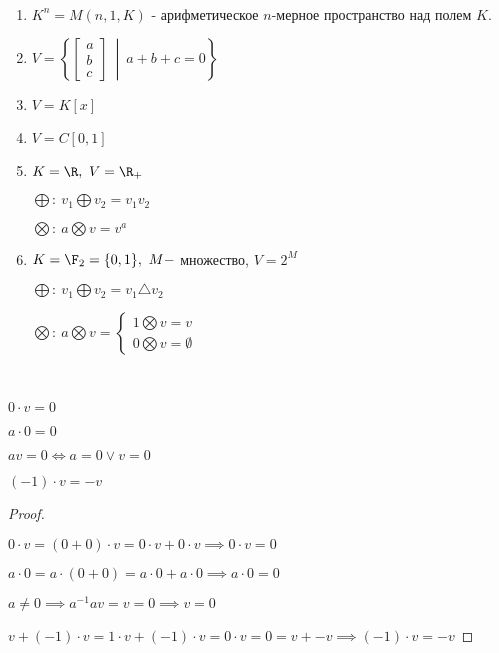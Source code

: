 \begin{example}~

    \begin{enumerate}
        \item $K^n = M(n, 1, K)$ - арифметическое $n$-мерное пространство над полем $K$.
        \item $V = \left\{\begin{bmatrix}
            a \\
            b \\
            c
        \end{bmatrix} ~ \middle| ~ a + b + c = 0\right\}$
        \item $V = K[x]$
        \item $V = C[0, 1]$
        \item $K = \R, ~ V = \R_+$

        $\bigoplus: ~ v_1 \bigoplus v_2 = v_1v_2$
    
        $\bigotimes: ~ a \bigotimes v = v^a$
        \item $K = \F_2 = \{0, 1\}, ~ M - $ множество, $V = 2^M$

        $\bigoplus: ~ v_1 \bigoplus v_2 = v_1\triangle v_2$
    
        $\bigotimes: ~ a \bigotimes v = \begin{cases}
            1 \bigotimes v = v \\
            0 \bigotimes v = \emptyset
        \end{cases}$
    \end{enumerate}
    
\end{example}

\begin{lemma}~

    $0 \cdot v = 0$

    $a \cdot 0 = 0$

    $av = 0 \iff a = 0 \lor v = 0$

    $(-1) \cdot v = -v$
\end{lemma}

\begin{proof}~

    $0 \cdot v = (0 + 0) \cdot v = 0 \cdot v + 0 \cdot v \implies 0 \cdot v = 0$

    $a \cdot 0 = a \cdot (0 + 0) = a \cdot 0 + a \cdot 0 \implies a \cdot 0 = 0$

    $a \neq 0 \implies a^{-1}av = v = 0 \implies v = 0$

    $v + (-1) \cdot v = 1 \cdot v + (-1) \cdot v = 0 \cdot v = 0 = v + -v \implies (-1) \cdot v = -v$
\end{proof}

